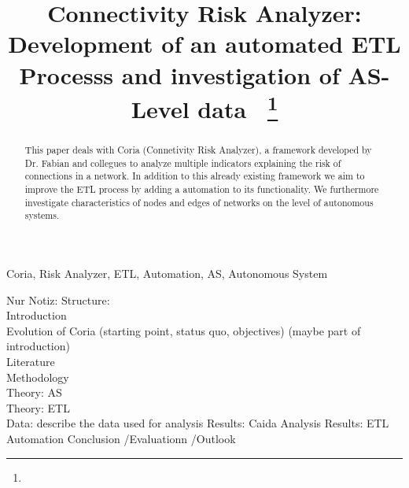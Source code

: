 \documentclass[conference]{IEEEtran}
\begin{document}
\title{Connectivity Risk Analyzer: Development of an automated ETL Processs and investigation of AS-Level data\
{\footnotesize \textsuperscript{}}
\thanks{}
}

\author{
\and
{}

}

\maketitle

\begin{abstract}

This paper deals with Coria (Connetivity Risk Analyzer), a framework developed by Dr. Fabian and collegues to analyze multiple indicators explaining the risk of connections in a network. In addition to this already existing framework we aim to improve the ETL process by adding a automation to its functionality. We furthermore investigate characteristics of nodes and edges of networks on the level of autonomous systems.
\end{abstract}

\begin{IEEEkeywords}
Coria, Risk Analyzer, ETL, Automation, AS, Autonomous System
\end{IEEEkeywords}

Nur Notiz:
Structure: \\
Introduction \\
Evolution of Coria (starting point, status quo, objectives) (maybe part of introduction) \\
Literature \\
Methodology \\
Theory: AS\\
Theory: ETL\\
Data: describe the data used for analysis
Results: Caida Analysis
Results: ETL Automation
Conclusion /Evaluationn /Outlook
\end{document}

